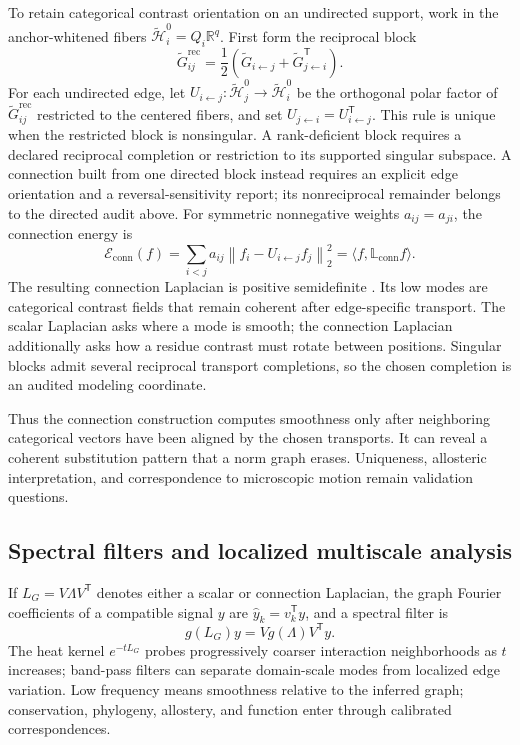 \documentclass[10pt]{article}
\newcommand{\R}{\mathbb R}
\theoremstyle{definition}
\theoremstyle{remark}
\newcommand{\BookInsert}[1]{}
\newcommand{\BookSpectralSection}[1]{\subsection{#1}}
\begin{document}
To retain categorical contrast orientation on an undirected support, work in the anchor-whitened
fibers $\widetilde{\mathcal H}_i^0=Q_i\R^q$.  First form the reciprocal block
\begin{equation}
\widetilde G_{ij}^{\mathrm{rec}}
=\frac12\left(
\widetilde G_{i\leftarrow j}
+\widetilde G_{j\leftarrow i}^{\mathsf T}
\right).
\label{eq:connection-reciprocal-block}
\end{equation}
For each undirected edge, let
$U_{i\leftarrow j}:\widetilde{\mathcal H}_j^0\to\widetilde{\mathcal H}_i^0$ be the orthogonal polar
factor of $\widetilde G_{ij}^{\mathrm{rec}}$ restricted to the centered fibers, and set
$U_{j\leftarrow i}=U_{i\leftarrow j}^{\mathsf T}$.  This rule is unique when the restricted block is
nonsingular.  A rank-deficient block requires a declared reciprocal completion or restriction to
its supported singular subspace.  A connection built from one directed block instead requires an
explicit edge orientation and a reversal-sensitivity report; its nonreciprocal remainder belongs
to the directed audit above.  For symmetric nonnegative
weights $a_{ij}=a_{ji}$, the connection energy is
\begin{equation}
\mathcal E_{\mathrm{conn}}(f)
=\sum_{i<j}a_{ij}
\left\|f_i-U_{i\leftarrow j}f_j\right\|_2^2
=\langle f,\mathbb L_{\mathrm{conn}}f\rangle.
\label{eq:connection-laplacian}
\end{equation}
The resulting connection Laplacian is positive semidefinite \cite{singer2012}.  Its low modes are
categorical contrast fields that remain coherent after edge-specific transport.  The scalar
Laplacian asks where a mode is smooth; the connection Laplacian additionally asks how a residue
contrast must rotate between positions.  Singular blocks admit several reciprocal transport
completions, so the chosen completion is an audited modeling coordinate.

Thus the connection construction computes smoothness only after neighboring categorical vectors
have been aligned by the chosen transports.  It can reveal a coherent substitution pattern that a
norm graph erases.  Uniqueness, allosteric interpretation, and correspondence to microscopic motion
remain validation questions.

\BookInsert{chapters/10_inverse_covariance_case}

\ifdefined\BOOKMODE
\BookSpectralSection{Spectral filters and localized multiscale analysis}
\fi
If $L_G=V\Lambda V^{\mathsf T}$ denotes either a scalar or connection Laplacian, the graph Fourier
coefficients of a compatible signal $y$ are $\widehat y_k=v_k^{\mathsf T}y$, and a spectral filter
is
\begin{equation}
g(L_G)y=Vg(\Lambda)V^{\mathsf T}y.
\label{eq:graph-fourier-filter}
\end{equation}
The heat kernel $e^{-tL_G}$ probes progressively coarser interaction neighborhoods as $t$ increases;
band-pass filters can separate domain-scale modes from localized edge variation.  Low frequency
means smoothness relative to the inferred graph; conservation, phylogeny, allostery, and function
enter through calibrated correspondences.
\end{document}

